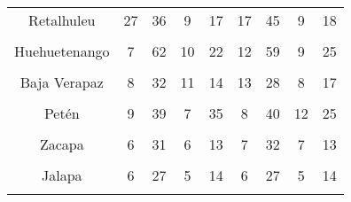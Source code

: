 {\begin{tabular}[t]{ccccccccc}
Retalhuleu & 27 & 36 & 9 & 17 & 17 & 45 & 9 & 18\\
\cellcolor[HTML]{B6B3FF}{San Marcos} & \cellcolor[HTML]{B6B3FF}{8} & \cellcolor[HTML]{B6B3FF}{51} & \cellcolor[HTML]{B6B3FF}{5} & \cellcolor[HTML]{B6B3FF}{17} & \cellcolor[HTML]{B6B3FF}{5} & \cellcolor[HTML]{B6B3FF}{52} & \cellcolor[HTML]{B6B3FF}{4} & \cellcolor[HTML]{B6B3FF}{19}\\
Huehuetenango & 7 & 62 & 10 & 22 & 12 & 59 & 9 & 25\\
\cellcolor[HTML]{B6B3FF}{Quiché} & \cellcolor[HTML]{B6B3FF}{10} & \cellcolor[HTML]{B6B3FF}{44} & \cellcolor[HTML]{B6B3FF}{10} & \cellcolor[HTML]{B6B3FF}{19} & \cellcolor[HTML]{B6B3FF}{6} & \cellcolor[HTML]{B6B3FF}{43} & \cellcolor[HTML]{B6B3FF}{11} & \cellcolor[HTML]{B6B3FF}{18}\\
Baja Verapaz & 8 & 32 & 11 & 14 & 13 & 28 & 8 & 17\\
\cellcolor[HTML]{B6B3FF}{Alta Verapaz} & \cellcolor[HTML]{B6B3FF}{10} & \cellcolor[HTML]{B6B3FF}{39} & \cellcolor[HTML]{B6B3FF}{9} & \cellcolor[HTML]{B6B3FF}{16} & \cellcolor[HTML]{B6B3FF}{7} & \cellcolor[HTML]{B6B3FF}{41} & \cellcolor[HTML]{B6B3FF}{8} & \cellcolor[HTML]{B6B3FF}{16}\\
Petén & 9 & 39 & 7 & 35 & 8 & 40 & 12 & 25\\
\cellcolor[HTML]{B6B3FF}{Izabal} & \cellcolor[HTML]{B6B3FF}{10} & \cellcolor[HTML]{B6B3FF}{23} & \cellcolor[HTML]{B6B3FF}{8} & \cellcolor[HTML]{B6B3FF}{13} & \cellcolor[HTML]{B6B3FF}{10} & \cellcolor[HTML]{B6B3FF}{24} & \cellcolor[HTML]{B6B3FF}{9} & \cellcolor[HTML]{B6B3FF}{15}\\
Zacapa & 6 & 31 & 6 & 13 & 7 & 32 & 7 & 13\\
\cellcolor[HTML]{B6B3FF}{Chiquimula} & \cellcolor[HTML]{B6B3FF}{8} & \cellcolor[HTML]{B6B3FF}{29} & \cellcolor[HTML]{B6B3FF}{9} & \cellcolor[HTML]{B6B3FF}{13} & \cellcolor[HTML]{B6B3FF}{7} & \cellcolor[HTML]{B6B3FF}{28} & \cellcolor[HTML]{B6B3FF}{10} & \cellcolor[HTML]{B6B3FF}{9}\\
Jalapa & 6 & 27 & 5 & 14 & 6 & 27 & 5 & 14\\
\cellcolor[HTML]{B6B3FF}{Jutiapa} & \cellcolor[HTML]{B6B3FF}{7} & \cellcolor[HTML]{B6B3FF}{27} & \cellcolor[HTML]{B6B3FF}{2} & \cellcolor[HTML]{B6B3FF}{12} & \cellcolor[HTML]{B6B3FF}{17} & \cellcolor[HTML]{B6B3FF}{27} & \cellcolor[HTML]{B6B3FF}{2} & \cellcolor[HTML]{B6B3FF}{12}\\
\bottomrule
\end{tabular}
}